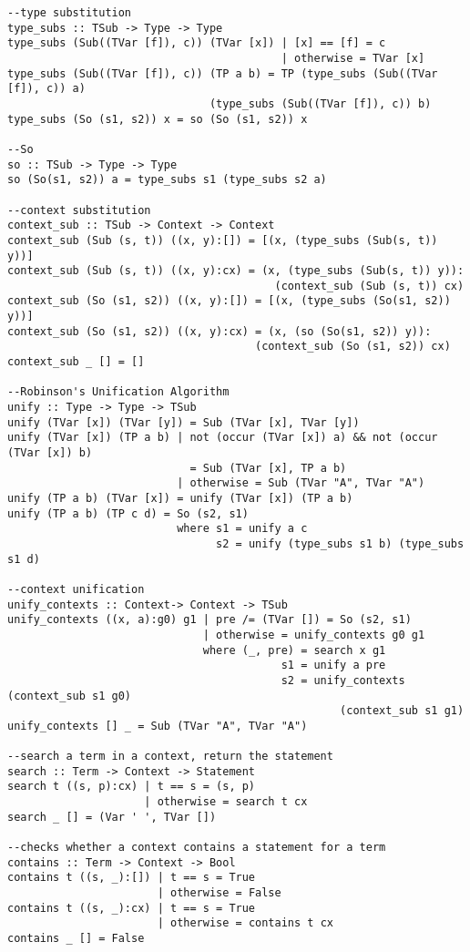 \begin{verbatim}
--type substitution
type_subs :: TSub -> Type -> Type
type_subs (Sub((TVar [f]), c)) (TVar [x]) | [x] == [f] = c
                                          | otherwise = TVar [x]
type_subs (Sub((TVar [f]), c)) (TP a b) = TP (type_subs (Sub((TVar [f]), c)) a)
                               (type_subs (Sub((TVar [f]), c)) b)
type_subs (So (s1, s2)) x = so (So (s1, s2)) x

--So
so :: TSub -> Type -> Type
so (So(s1, s2)) a = type_subs s1 (type_subs s2 a)

--context substitution
context_sub :: TSub -> Context -> Context
context_sub (Sub (s, t)) ((x, y):[]) = [(x, (type_subs (Sub(s, t)) y))]
context_sub (Sub (s, t)) ((x, y):cx) = (x, (type_subs (Sub(s, t)) y)):
                                         (context_sub (Sub (s, t)) cx)
context_sub (So (s1, s2)) ((x, y):[]) = [(x, (type_subs (So(s1, s2)) y))]
context_sub (So (s1, s2)) ((x, y):cx) = (x, (so (So(s1, s2)) y)):
                                      (context_sub (So (s1, s2)) cx)
context_sub _ [] = []

--Robinson's Unification Algorithm
unify :: Type -> Type -> TSub
unify (TVar [x]) (TVar [y]) = Sub (TVar [x], TVar [y])
unify (TVar [x]) (TP a b) | not (occur (TVar [x]) a) && not (occur (TVar [x]) b) 
                            = Sub (TVar [x], TP a b)
                          | otherwise = Sub (TVar "A", TVar "A")
unify (TP a b) (TVar [x]) = unify (TVar [x]) (TP a b)
unify (TP a b) (TP c d) = So (s2, s1)
                          where s1 = unify a c
                                s2 = unify (type_subs s1 b) (type_subs s1 d)

--context unification
unify_contexts :: Context-> Context -> TSub
unify_contexts ((x, a):g0) g1 | pre /= (TVar []) = So (s2, s1)
                              | otherwise = unify_contexts g0 g1
                              where (_, pre) = search x g1
                                          s1 = unify a pre
                                          s2 = unify_contexts (context_sub s1 g0) 
                                                   (context_sub s1 g1)
unify_contexts [] _ = Sub (TVar "A", TVar "A")

--search a term in a context, return the statement
search :: Term -> Context -> Statement
search t ((s, p):cx) | t == s = (s, p)
                     | otherwise = search t cx
search _ [] = (Var ' ', TVar [])

--checks whether a context contains a statement for a term
contains :: Term -> Context -> Bool
contains t ((s, _):[]) | t == s = True
                       | otherwise = False
contains t ((s, _):cx) | t == s = True
                       | otherwise = contains t cx
contains _ [] = False



\end{verbatim}
